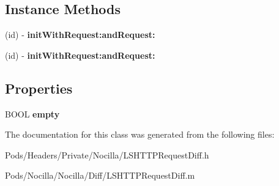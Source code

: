 \subsection*{Instance Methods}
\begin{DoxyCompactItemize}
\item 
\hypertarget{interface_l_s_h_t_t_p_request_diff_a3fa07438fa8fa04f97f3fac2d07232f9}{(id) -\/ {\bfseries init\-With\-Request\-:and\-Request\-:}}\label{interface_l_s_h_t_t_p_request_diff_a3fa07438fa8fa04f97f3fac2d07232f9}

\item 
\hypertarget{interface_l_s_h_t_t_p_request_diff_a3fa07438fa8fa04f97f3fac2d07232f9}{(id) -\/ {\bfseries init\-With\-Request\-:and\-Request\-:}}\label{interface_l_s_h_t_t_p_request_diff_a3fa07438fa8fa04f97f3fac2d07232f9}

\end{DoxyCompactItemize}
\subsection*{Properties}
\begin{DoxyCompactItemize}
\item 
\hypertarget{interface_l_s_h_t_t_p_request_diff_af677bdd4813e84d2df457a56c200cbb4}{B\-O\-O\-L {\bfseries empty}}\label{interface_l_s_h_t_t_p_request_diff_af677bdd4813e84d2df457a56c200cbb4}

\end{DoxyCompactItemize}


The documentation for this class was generated from the following files\-:\begin{DoxyCompactItemize}
\item 
Pods/\-Headers/\-Private/\-Nocilla/L\-S\-H\-T\-T\-P\-Request\-Diff.\-h\item 
Pods/\-Nocilla/\-Nocilla/\-Diff/L\-S\-H\-T\-T\-P\-Request\-Diff.\-m\end{DoxyCompactItemize}
